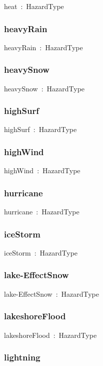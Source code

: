 \documentclass{article}
\begin{document}
heat~:~HazardType

\subsubsection*{heavyRain}

heavyRain~:~HazardType

\subsubsection*{heavySnow}

heavySnow~:~HazardType

\subsubsection*{highSurf}

highSurf~:~HazardType

\subsubsection*{highWind}

highWind~:~HazardType

\subsubsection*{hurricane}

hurricane~:~HazardType

\subsubsection*{iceStorm}

iceStorm~:~HazardType

\subsubsection*{lake-EffectSnow}

lake-EffectSnow~:~HazardType

\subsubsection*{lakeshoreFlood}

lakeshoreFlood~:~HazardType

\subsubsection*{lightning}
\end{document}
